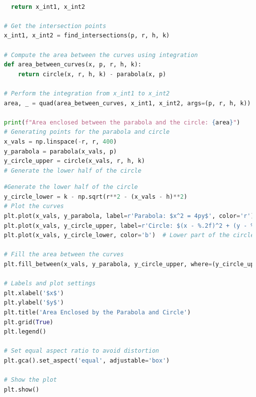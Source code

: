 \documentclass{beamer}
\theoremstyle{remark}
\numberwithin{equation}{section}
\begin{document}
\begin{frame}[fragile]
\begin{lstlisting}[language=Python]

  return x_int1, x_int2

# Get the intersection points
x_int1, x_int2 = find_intersections(p, r, h, k)

# Compute the area between the curves using integration
def area_between_curves(x, p, r, h, k):
    return circle(x, r, h, k) - parabola(x, p)

# Perform the integration from x_int1 to x_int2
area, _ = quad(area_between_curves, x_int1, x_int2, args=(p, r, h, k))

print(f"Area enclosed between the parabola and the circle: {area}")
# Generating points for the parabola and circle
x_vals = np.linspace(-r, r, 400)
y_parabola = parabola(x_vals, p)
y_circle_upper = circle(x_vals, r, h, k)
# Generate the lower half of the circle

\end{lstlisting}
\end{frame}

\begin{frame}[fragile]
\begin{lstlisting}[language=Python]
 #Generate the lower half of the circle
y_circle_lower = k - np.sqrt(r**2 - (x_vals - h)**2)
# Plot the curves
plt.plot(x_vals, y_parabola, label=r'Parabola: $x^2 = 4py$', color='r')
plt.plot(x_vals, y_circle_upper, label=r'Circle: $(x - %.2f)^2 + (y - %.2f)^2 = %.2f^2$' % (h, k, r), color='b')
plt.plot(x_vals, y_circle_lower, color='b')  # Lower part of the circle (no extra label)

# Fill the area between the curves
plt.fill_between(x_vals, y_parabola, y_circle_upper, where=(y_circle_upper >= y_parabola), color='lightblue', alpha=0.5)

# Labels and plot settings
plt.xlabel('$x$')
plt.ylabel('$y$')
plt.title('Area Enclosed by the Parabola and Circle')
plt.grid(True)
plt.legend()

# Set equal aspect ratio to avoid distortion
plt.gca().set_aspect('equal', adjustable='box')

# Show the plot
plt.show()
\end{lstlisting}
\end{frame}
\end{document}
